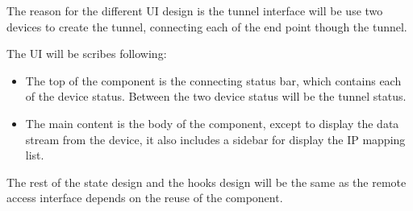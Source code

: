 The reason for the different UI design is the tunnel interface will be use two devices to create the tunnel,
connecting each of the end point though the tunnel.

The UI will be scribes following:
\begin{itemize}
    \item The top of the component is the connecting status bar, which contains each of the device status.
    Between the two device status will be the tunnel status. 
    \item The main content is the body of the component, except to display the data stream from the device, 
    it also includes a sidebar for display the IP mapping list.
\end{itemize}

The rest of the state design and the hooks design will be the same as the remote access interface 
depends on the reuse of the component. 